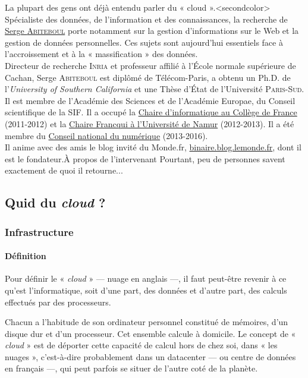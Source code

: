 La plupart des gens ont déjà entendu parler du « \gls{cloud} ».\caution[t]<secondcolor>{%
Spécialiste des données, de l’information et des connaissances, la recherche de \href{https://fr.wikipedia.org/wiki/Serge_Abiteboul}{Serge \textsc{Abiteboul}} porte notamment sur la gestion d'informations sur le Web et la gestion de données personnelles. Ces sujets sont aujourd'hui essentiels face à l'accroissement et à la « massification » des données.\\
Directeur de recherche \textsc{Inria} et professeur affilié à l’École normale supérieure de Cachan, Serge \textsc{Abiteboul} est diplômé de Télécom-Paris, a obtenu un Ph.D. de l'\textit{University of Southern California} et une Thèse d'État de l'Université \textsc{Paris-Sud}. Il est membre de l'Académie des Sciences et de l'Académie Europae, du Conseil scientifique de la SIF.
Il a occupé la \href{http://www.college-de-france.fr/site/serge-abiteboul/}{Chaire d'informatique au Collège de France} (2011-2012) et la \href{https://www.info.fundp.ac.be/francqui2013/}{Chaire Francqui à l'Université de Namur} (2012-2013). Il a été membre du \href{https://cnnumerique.fr/}{Conseil national du numérique} (2013-2016).\\
Il anime avec des amis le blog invité du Monde.fr, \url{binaire.blog.lemonde.fr}, dont il est le fondateur.}{À propos de l'intervenant} Pourtant, peu de personnes savent exactement de quoi il retourne...

\subsection[Quid du \textit{cloud} ?]{Quid du \textit{cloud} ?}
\label{sub:II.2.1}

\subsubsection[Infrastructure]{Infrastructure}
\label{subsub:II.2.1.1}

\paragraph*{Définition} Pour définir le « \textit{cloud} » --- nuage en anglais ---, il faut peut-être revenir à ce qu'est l'informatique, soit d'une part, des données et d'autre part, des calculs effectués par des processeurs. 

Chacun a l'habitude de son ordinateur personnel constitué de mémoires, d'un disque dur et d'un processeur. Cet ensemble calcule à domicile. Le concept de « \textit{cloud} » est de déporter cette capacité de calcul hors de chez soi, dans « les nuages », c'est-à-dire probablement dans un \gls{datacenter} --- ou centre de données en français ---, qui peut parfois se situer de l'autre coté de la planète.


